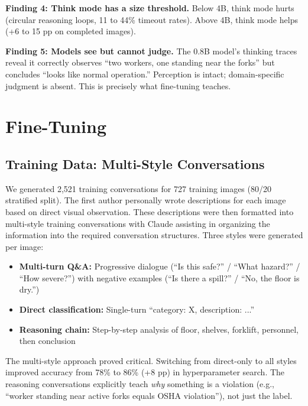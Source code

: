\documentclass[12pt, a4paper]{article}
\begin{document}
\textbf{Finding 4: Think mode has a size threshold.} Below 4B, think mode hurts (circular reasoning loops, 11 to 44\% timeout rates). Above 4B, think mode helps (+6 to 15 pp on completed images).

\textbf{Finding 5: Models see but cannot judge.} The 0.8B model's thinking traces reveal it correctly observes ``two workers, one standing near the forks'' but concludes ``looks like normal operation.'' Perception is intact; domain-specific judgment is absent. This is precisely what fine-tuning teaches.

\section{Fine-Tuning}

\subsection{Training Data: Multi-Style Conversations}

We generated 2,521 training conversations for 727 training images (80/20 stratified split). The first author personally wrote descriptions for each image based on direct visual observation. These descriptions were then formatted into multi-style training conversations with Claude assisting in organizing the information into the required conversation structures. Three styles were generated per image:

\begin{itemize}
    \item \textbf{Multi-turn Q\&A:} Progressive dialogue (``Is this safe?'' / ``What hazard?'' / ``How severe?'') with negative examples (``Is there a spill?'' / ``No, the floor is dry.'')
    \item \textbf{Direct classification:} Single-turn ``category: X, description: ...''
    \item \textbf{Reasoning chain:} Step-by-step analysis of floor, shelves, forklift, personnel, then conclusion
\end{itemize}

The multi-style approach proved critical. Switching from direct-only to all styles improved accuracy from 78\% to 86\% (+8 pp) in hyperparameter search. The reasoning conversations explicitly teach \textit{why} something is a violation (e.g., ``worker standing near active forks equals OSHA violation''), not just the label.
\end{document}
